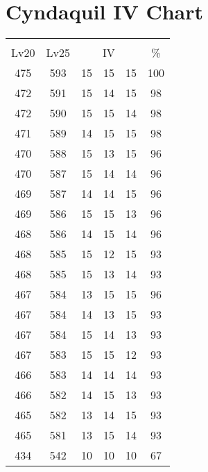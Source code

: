\documentclass{article}%
\begin{document}
%
\normalsize%
\section{Cyndaquil IV Chart}%
\label{sec:Cyndaquil IV Chart}%
\renewcommand{\arraystretch}{1.5}%
\begin{tabular}{|c|c|c|c|c|c|}%
\hline%
\multicolumn{6}{|c|}{\textcolor{white}{ 
\linebreak{Cyndaquil}
}%
\cellcolor{black}}\\%
\multicolumn{1}{|c}{Lv20}&\multicolumn{1}{c|}{Lv25}&\multicolumn{3}{c|}{IV}&\multicolumn{1}{|c|}{\%}\\%
\hline%
\rowcolor{color100}%
475&593&15&15&15&100\\%
\hline%
\rowcolor{color98}%
472&591&15&14&15&98\\%
\hline%
\rowcolor{color98}%
472&590&15&15&14&98\\%
\hline%
\rowcolor{color98}%
471&589&14&15&15&98\\%
\hline%
\rowcolor{color96}%
470&588&15&13&15&96\\%
\hline%
\rowcolor{color96}%
470&587&15&14&14&96\\%
\hline%
\rowcolor{color96}%
469&587&14&14&15&96\\%
\hline%
\rowcolor{color96}%
469&586&15&15&13&96\\%
\hline%
\rowcolor{color96}%
468&586&14&15&14&96\\%
\hline%
\rowcolor{color93}%
468&585&15&12&15&93\\%
\hline%
\rowcolor{color93}%
468&585&15&13&14&93\\%
\hline%
\rowcolor{color96}%
467&584&13&15&15&96\\%
\hline%
\rowcolor{color93}%
467&584&14&13&15&93\\%
\hline%
\rowcolor{color93}%
467&584&15&14&13&93\\%
\hline%
\rowcolor{color93}%
467&583&15&15&12&93\\%
\hline%
\rowcolor{color93}%
466&583&14&14&14&93\\%
\hline%
\rowcolor{color93}%
466&582&14&15&13&93\\%
\hline%
\rowcolor{color93}%
465&582&13&14&15&93\\%
\hline%
\rowcolor{color93}%
465&581&13&15&14&93\\%
\hline%
\rowcolor{color91}%
434&542&10&10&10&67\\%
\end{tabular}

%
\end{document}
